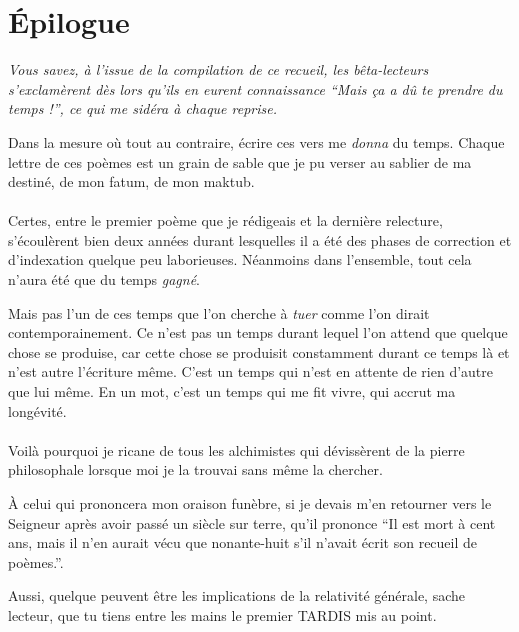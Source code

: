 \section*{Épilogue}
\thispagestyle{empty}
%
%
%
{\em\small
  Vous savez, à l’issue de la compilation de ce recueil, les bêta-lecteurs s’exclamèrent dès lors qu’ils en eurent connaissance \enquote{Mais ça a dû te \emph{prendre} du temps !}, ce qui me sidéra à chaque reprise.

  Dans la mesure où tout au contraire, écrire ces vers me \emph{donna} du temps. Chaque lettre de ces poèmes est un grain de sable que je pu verser au sablier de ma destiné, de mon fatum, de mon maktub.

  \paragraph{}
  Certes, entre le premier poème que je rédigeais et la dernière relecture, s’écoulèrent bien deux années durant lesquelles il a été des phases de correction et d’indexation quelque peu laborieuses. Néanmoins dans l’ensemble, tout cela n’aura été que du temps \emph{gagné}.

  Mais pas l’un de ces temps que l’on cherche à \emph{tuer} comme l’on dirait contemporainement. 
  Ce n’est pas un temps durant lequel l’on attend que quelque chose se produise, car cette chose se produisit constamment durant ce temps là et n’est autre l’écriture même. C’est un temps qui n’est en attente de rien d’autre que lui même. En un mot, c’est un temps qui me fit vivre, qui accrut ma longévité.

  \paragraph{}
  Voilà pourquoi je ricane de tous les alchimistes qui dévissèrent de la pierre philosophale lorsque moi je la trouvai sans même la chercher.

  À celui qui prononcera mon oraison funèbre, si je devais m’en retourner vers le Seigneur après avoir passé un siècle sur terre, qu’il prononce \enquote{Il est mort à cent ans, mais il n’en aurait vécu que nonante-huit s’il n’avait écrit son recueil de poèmes.}.

  Aussi, quelque peuvent être les implications de la relativité générale, sache lecteur, que tu tiens entre les mains le premier TARDIS mis au point.


}

